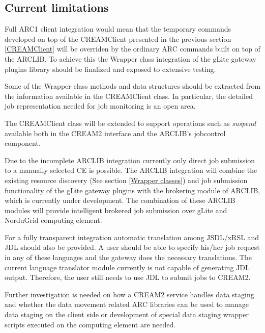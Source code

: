 \documentclass{article}
\begin{document}
\subsection{Current limitations}
\label{Current limitations}
Full ARC1 client integration would mean that the temporary commands developed on top of the CREAMClient presented in the previous section \ref{CREAMClient} will be overriden by the ordinary ARC commands built on top of the ARCLIB. To achieve this the Wrapper class integration of the gLite gateway plugins library should be finalized and exposed to extensive testing.\par
Some of the Wrapper class methods and data structures should be extracted from the information available in the CREAMClient class. In particular, the detailed job representation needed for job monitoring is an open area.\par
The CREAMClient class will be extended to support operations such as \textit{suspend} available both in the CREAM2 interface and the ARCLIB's jobcontrol component.\par
Due to the incomplete ARCLIB integration currently only direct job submission to a manually selected CE is possible. The ARCLIB integration will combine the existing resource discovery (See section \ref{Wrapper classes}) and job submission functionality of the gLite gateway plugins with the brokering module of ARCLIB, which is  currently under development. The combination of these ARCLIB modules will provide intelligent brokered job submission over gLite and NorduGrid computing element.\par
For a fully transparent integration automatic translation among JSDL/xRSL and JDL should also be provided. A user should be able to specify his/her job request in any of these languages and the gateway does the necessary translations.  The current language translator module currently is not capable of generating JDL output.  Therefore, the user still needs to use JDL to submit jobs to CREAM2.\par
Further investigation is needed on how a CREAM2 service handles data staging and whether the data movement related ARC libraries can be used to manage data staging on the client side or development of special data staging wrapper scripts executed on the computing element are needed.
\end{document}
